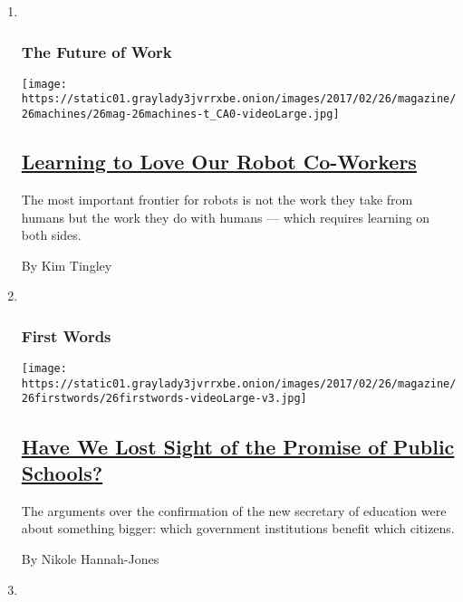 \begin{enumerate}
\def\labelenumi{\arabic{enumi}.}
\item ~
  \hypertarget{the-future-of-work-4}{%
  \subsubsection{The Future of Work}\label{the-future-of-work-4}}

  \texttt{[image: https://static01.graylady3jvrrxbe.onion/images/2017/02/26/magazine/26machines/26mag-26machines-t\_CA0-videoLarge.jpg]}

  \hypertarget{learning-to-love-our-robot-co-workers}{%
  \subsection{\texorpdfstring{\href{/2017/02/23/magazine/learning-to-love-our-robot-co-workers.html}{Learning
  to Love Our Robot
  Co-Workers}}{Learning to Love Our Robot Co-Workers}}\label{learning-to-love-our-robot-co-workers}}

  The most important frontier for robots is not the work they take from
  humans but the work they do with humans --- which requires learning on
  both sides.

  By Kim Tingley
\item ~
  \hypertarget{first-words}{%
  \subsubsection{First Words}\label{first-words}}

  \texttt{[image: https://static01.graylady3jvrrxbe.onion/images/2017/02/26/magazine/26firstwords/26firstwords-videoLarge-v3.jpg]}

  \hypertarget{have-we-lost-sight-of-the-promise-of-public-schools}{%
  \subsection{\texorpdfstring{\href{/2017/02/21/magazine/have-we-lost-sight-of-the-promise-of-public-schools.html}{Have
  We Lost Sight of the Promise of Public
  Schools?}}{Have We Lost Sight of the Promise of Public Schools?}}\label{have-we-lost-sight-of-the-promise-of-public-schools}}

  The arguments over the confirmation of the new secretary of education
  were about something bigger: which government institutions benefit
  which citizens.

  By Nikole Hannah-Jones
\item ~
  \hypertarget{talk}{%
}
\end{enumerate}
